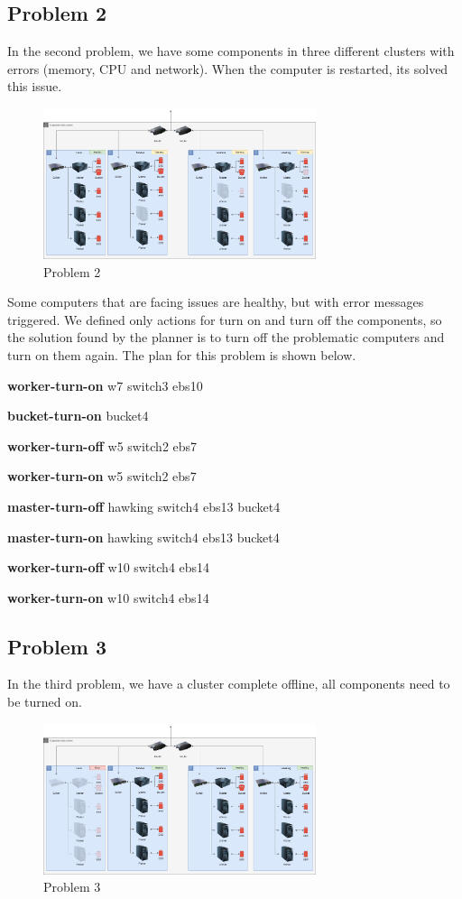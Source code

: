 \documentclass[letterpaper]{article}
\begin{document}
\subsection{Problem 2}\label{sec:experiments2}

In the second problem, we have some components in three different clusters with errors (memory, CPU and network). When the computer is restarted, its solved this issue.

\begin{figure}[ht]
    \centering
    \includegraphics[width=8cm]{images/diagrams-pb2.png}
    \caption{Problem 2}
    \label{fig:data-center-pb2}
\end{figure}

Some computers that are facing issues are healthy, but with error messages triggered. We defined only actions for turn on and turn off the components, so the solution found by the planner is to turn off the problematic computers and turn on them again. The plan for this problem is shown below.

\textbf{worker-turn-on} w7 switch3 ebs10 

\textbf{bucket-turn-on} bucket4 

\textbf{worker-turn-off} w5 switch2 ebs7 

\textbf{worker-turn-on} w5 switch2 ebs7 

\textbf{master-turn-off} hawking switch4 ebs13 bucket4 

\textbf{master-turn-on} hawking switch4 ebs13 bucket4 

\textbf{worker-turn-off} w10 switch4 ebs14 

\textbf{worker-turn-on} w10 switch4 ebs14

\subsection{Problem 3}\label{sec:experiments3}

In the third problem, we have a cluster complete offline, all components need to be turned on.

\begin{figure}[ht]
    \centering
    \includegraphics[width=8cm]{images/diagrams-pb3.png}
    \caption{Problem 3}
    \label{fig:data-center-pb3}
\end{figure}
\end{document}

